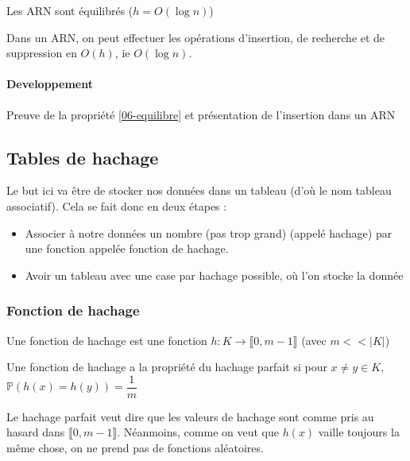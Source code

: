 \begin{proposition}
	\label{06-equilibre}
	Les ARN sont équilibrés ($h = O(\log n)$)
\end{proposition}

\begin{corollary}
	Dans un ARN, on peut effectuer les opérations d'insertion, de recherche et de suppression en $O(h)$, ie $O(\log n)$. 
\end{corollary}

\paragraph{Developpement} Preuve de la propriété \ref{06-equilibre} et présentation de l'insertion dans un ARN

\subsection{Tables de hachage}

\begin{idee}
	Le but ici va être de stocker nos données dans un tableau (d'où le nom tableau associatif). Cela se fait donc en deux étapes : \begin{itemize}
		\item Associer à notre données un nombre (pas trop grand) (appelé hachage) par une fonction appelée fonction de hachage.
		\item Avoir un tableau avec une case par hachage possible, où l'on stocke la donnée
	\end{itemize}
\end{idee}

\subsubsection{Fonction de hachage}

\begin{definition}
	Une fonction de hachage est une fonction $h : K \to \llbracket 0, m-1 \rrbracket$ (avec $m << |K|$)
\end{definition}

\begin{proposition}
	Une fonction de hachage a la propriété du hachage parfait si pour $x \neq y \in K$, $\mathbb P(h(x) = h(y)) = \dfrac{1}{m}$
\end{proposition}

\begin{rem}
	Le hachage parfait veut dire que les valeurs de hachage sont comme pris au hasard dans $\llbracket 0, m-1\rrbracket$. Néanmoins, comme on veut que $h(x)$ vaille toujours la même chose, on ne prend pas de fonctions aléatoires.
\end{rem}

